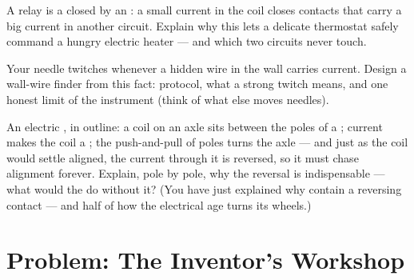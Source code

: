 \begin{exercise}[$\star\star$]\label{exo:g8:electric-current-effects:10}
A relay is a  closed by an : a small current
in the coil closes contacts that carry a big current in another
circuit. Explain why this lets a delicate thermostat safely
command a hungry electric heater --- and which two circuits
never touch.
\end{exercise}

\begin{exercise}[$\star\star$]\label{exo:g8:electric-current-effects:11}
Your  needle twitches whenever a hidden wire in the wall
carries current. Design a wall-wire finder from this fact:
protocol, what a strong twitch means, and one honest limit of
the instrument (think of what else moves  needles).
\end{exercise}

\begin{exercise}[$\star\star\star$]\label{exo:g8:electric-current-effects:12}
An electric , in outline: a coil on an axle sits between
the poles of a ; current makes the coil a ; the
push-and-pull of poles turns the axle --- and just as the coil
would settle aligned, the current through it is reversed, so it
must chase alignment forever. Explain, pole by pole, why the
reversal is indispensable --- what would the  do without
it? (You have just explained why  contain a reversing
contact --- and half of how the electrical age turns its
wheels.)
\end{exercise}

\section{Problem: The Inventor's Workshop}

